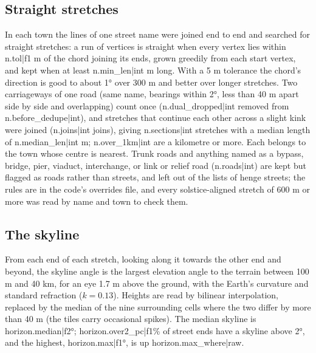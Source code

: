 \documentclass[11pt,a4paper]{article}
\begin{document}
\subsection{Straight stretches}
In each town the lines of one street name were joined end to end and searched for straight stretches: a run of vertices is straight when every vertex lies within {{n.tol|f1}} m of the chord joining its ends, grown greedily from each start vertex, and kept when at least {{n.min_len|int}} m long. With a 5 m tolerance the chord's direction is good to about 1° over 300 m and better over longer stretches. Two carriageways of one road (same name, bearings within 2°, less than 40 m apart side by side and overlapping) count once ({{n.dual_dropped|int}} removed from {{n.before_dedupe|int}}), and stretches that continue each other across a slight kink were joined ({{n.joins|int}} joins), giving {{n.sections|int}} stretches with a median length of {{n.median_len|int}} m; {{n.over_1km|int}} are a kilometre or more. Each belongs to the town whose centre is nearest. Trunk roads and anything named as a bypass, bridge, pier, viaduct, interchange, or link or relief road ({{n.roads|int}}) are kept but flagged as roads rather than streets, and left out of the lists of henge streets; the rules are in the code's overrides file, and every solstice-aligned stretch of 600 m or more was read by name and town to check them.

\subsection{The skyline}
From each end of each stretch, looking along it towards the other end and beyond, the skyline angle is the largest elevation angle to the terrain between 100 m and 40 km, for an eye 1.7 m above the ground, with the Earth's curvature and standard refraction ($k = 0.13$). Heights are read by bilinear interpolation, replaced by the median of the nine surrounding cells where the two differ by more than 40 m (the tiles carry occasional spikes). The median skyline is {{horizon.median|f2}}°; {{horizon.over2_pc|f1}}\% of street ends have a skyline above 2°, and the highest, {{horizon.max|f1}}°, is up {{horizon.max_where|raw}}.
\end{document}
